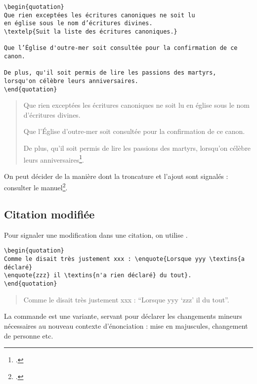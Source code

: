 \begin{verbatim}
\begin{quotation}
Que rien exceptées les écritures canoniques ne soit lu
en église sous le nom d’écritures divines.
\textelp{Suit la liste des écritures canoniques.}

Que l’Église d'outre-mer soit consultée pour la confirmation de ce canon.

De plus, qu'il soit permis de lire les passions des martyrs,
lorsqu'on célèbre leurs anniversaires.
\end{quotation}
\end{verbatim}

	\begin{quotation}
	Que rien exceptées les écritures canoniques ne soit lu en église sous le nom d’écritures divines.

Que l’Église d'outre-mer soit consultée pour la confirmation de ce canon.

De plus, qu'il soit permis de lire les passions des martyrs, lorsqu'on célèbre leurs anniversaires\footcite{BreveHippone}.
	\end{quotation}

\begin{anedocte}
On peut décider de la manière dont la troncature et l'ajout sont signalés : consulter le manuel\footcite{csquotes_ellipses}.
\end{anedocte}

\subsection{Citation modifiée}

Pour signaler une modification dans une citation, on utilise  .
\begin{verbatim}
\begin{quotation}
Comme le disait très justement xxx : \enquote{Lorsque yyy \textins{a déclaré}
\enquote{zzz} il \textins{n'a rien déclaré} du tout}.
\end{quotation}
\end{verbatim}

\begin{quotation}
	Comme le disait très justement xxx : \enquote{Lorsque yyy  \enquote{zzz} il  du tout}.
\end{quotation}

La commande  est une variante, servant pour déclarer les changements mineurs nécessaires au nouveau contexte d'énonciation : mise en majuscules, changement de personne etc.
